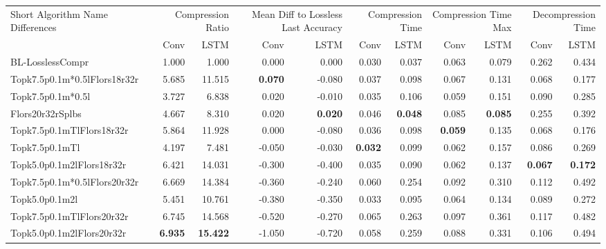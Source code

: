 \begin{tabular}{lrrrrrrrrrr}
\toprule
\multicolumn{1}{p{2.5cm}}{Short Algorithm Name Differences} & \multicolumn{2}{p{1.7cm}}{Compression Ratio} & \multicolumn{2}{p{1.7cm}}{Mean Diff to Lossless Last Accuracy} & \multicolumn{2}{p{1.7cm}}{Compression Time} & \multicolumn{2}{p{1.7cm}}{Compression Time Max} & \multicolumn{2}{p{1.7cm}}{Decompression Time} \\
 & Conv & LSTM & Conv & LSTM & Conv & LSTM & Conv & LSTM & Conv & LSTM \\
\midrule
BL-LosslessCompr & 1.000 & 1.000 & 0.000 & 0.000 & 0.030 & 0.037 & 0.063 & 0.079 & 0.262 & 0.434 \\
Topk7.5p0.1m*0.5lFlors18r32r & 5.685 & 11.515 & \bfseries 0.070 & -0.080 & 0.037 & 0.098 & 0.067 & 0.131 & 0.068 & 0.177 \\
Topk7.5p0.1m*0.5l & 3.727 & 6.838 & 0.020 & -0.010 & 0.035 & 0.106 & 0.059 & 0.151 & 0.090 & 0.285 \\
Flors20r32rSplbs & 4.667 & 8.310 & 0.020 & \bfseries 0.020 & 0.046 & \bfseries 0.048 & 0.085 & \bfseries 0.085 & 0.255 & 0.392 \\
Topk7.5p0.1mTlFlors18r32r & 5.864 & 11.928 & 0.000 & -0.080 & 0.036 & 0.098 & \bfseries 0.059 & 0.135 & 0.068 & 0.176 \\
Topk7.5p0.1mTl & 4.197 & 7.481 & -0.050 & -0.030 & \bfseries 0.032 & 0.099 & 0.062 & 0.157 & 0.086 & 0.269 \\
Topk5.0p0.1m2lFlors18r32r & 6.421 & 14.031 & -0.300 & -0.400 & 0.035 & 0.090 & 0.062 & 0.137 & \bfseries 0.067 & \bfseries 0.172 \\
Topk7.5p0.1m*0.5lFlors20r32r & 6.669 & 14.384 & -0.360 & -0.240 & 0.060 & 0.254 & 0.092 & 0.310 & 0.112 & 0.492 \\
Topk5.0p0.1m2l & 5.451 & 10.761 & -0.380 & -0.350 & 0.033 & 0.095 & 0.064 & 0.134 & 0.089 & 0.272 \\
Topk7.5p0.1mTlFlors20r32r & 6.745 & 14.568 & -0.520 & -0.270 & 0.065 & 0.263 & 0.097 & 0.361 & 0.117 & 0.482 \\
Topk5.0p0.1m2lFlors20r32r & \bfseries 6.935 & \bfseries 15.422 & -1.050 & -0.720 & 0.058 & 0.259 & 0.088 & 0.331 & 0.106 & 0.494 \\
\bottomrule
\end{tabular}
